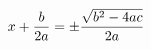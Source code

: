 \documentclass[preview]{standalone}
\begin{document}
\begin{align*}
\special{dvisvgm:raw <g id='unique000'>}x+\frac{b}{2a}=\pm\frac{\sqrt{b^2-4ac}}{2a}\special{dvisvgm:raw </g>}
\end{align*}
\end{document}
